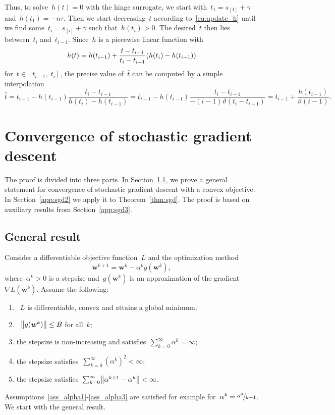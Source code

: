 \noindent Thus, to solve~$h(t) = 0$ with the hinge surrogate, we start with~$t_1 = s_{[1]}  + \gamma$ and~$h(t_1) = -n\tau$. Then we start decreasing~$t$ according to~\eqref{eq:update_h} until we find some~$t_i = s_{[i]} + \gamma$ such that~$h(t_i) > 0$. The desired~$t$ then lies between~$t_i$ and~$t_{i-1}$. Since~$h$ is a piecewise linear function with
\begin{equation*}
  h(t) = h(t_{i-1}) + \frac{t - t_{i-1}}{t_{i} - t_{i-1}}\Brac{h(t_{i}) - h(t_{i-1})}
\end{equation*}
for~$t \in [t_{i-1}, \; t_{i}]$, the precise value of~$\hat{t}$ can be computed by a simple interpolation
\begin{equation*}
  \hat{t}
    = t_{i-1} - h(t_{i-1})\frac{t_{i} - t_{i-1}}{h(t_{i}) - h(t_{i-1})}
    = t_{i-1} - h(t_{i-1})\frac{t_{i} - t_{i-1}}{-(i-1)\vartheta(t_{i} - t_{i-1})}
    = t_{i-1} + \frac{h(t_{i-1})}{\vartheta(i-1)}.
\end{equation*}

\section{Convergence of stochastic gradient descent}

The proof is divided into three parts. In Section~\ref{app:sgd1}, we prove a general statement for convergence of stochastic gradient descent with a convex objective. In Section~\ref{app:sgd2} we apply it to Theorem~\ref{thm:sgd}. The proof is based on auxiliary results from Section~\ref{app:sgd3}.

\subsection{General result}\label{app:sgd1}

Consider a differentiable objective function~$L$ and the optimization method
\begin{equation}\label{eq:update}
  \bm{w}^{k+1} = \bm{w}^k - \alpha^k g(\bm{w}^k),
\end{equation}
where~$\alpha^k > 0$ is a stepsize and~$g(\bm{w}^k)$ is an approximation of the gradient~$\nabla L(\bm{w}^k)$. Assume the following:
\begin{enumerate}[label={(A\arabic*)}]
  \item \label{ass_convex}~$L$ is differentiable, convex and attains a global minimum;
  \item \label{ass_gbound}~$\norm{g(\bm{w}^k)}\le B$ for all~$k$;
  \item \label{ass_alpha1} the stepsize is non-increasing and satisfies~$\sum_{k=0}^\infty \alpha^k = \infty$;
  \item \label{ass_alpha2} the stepsize satisfies~$\sum_{k=0}^\infty (\alpha^k)^2<\infty$;
  \item \label{ass_alpha3} the stepsize satisfies~$\sum_{k=0}^\infty \norm{\alpha^{k+1}-  \alpha^k}<\infty$.
\end{enumerate}
Assumptions~\ref{ass_alpha1}-\ref{ass_alpha3} are satisfied for example for~$\alpha^k = \nicefrac{\alpha^0}{k+1}$. We start with the general result.

